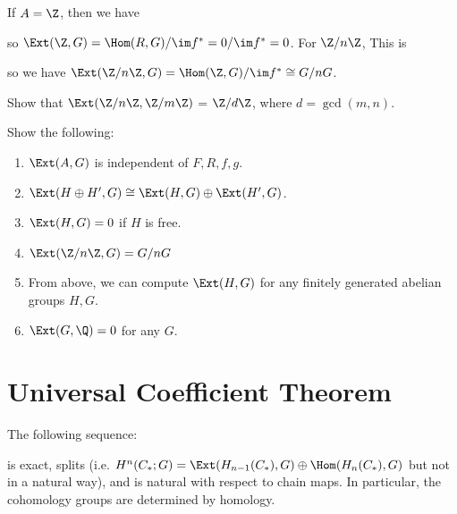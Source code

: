 \begin{example}
  If $A = \Z$, then we have
  \begin{center}
  \end{center}
  so $\Ext(\Z, G) = \Hom(R, G) / {\im f^*} = 0 / {\im f^*} = 0$.
  For $\Z / n\Z$, This is
  \begin{center}
  \end{center}
  so we have $\Ext(\Z / n\Z, G) = \Hom(\Z, G) / {\im f^*} \cong G / n G$.
\end{example}

\begin{exercise}
  Show that $\Ext(\Z / n\Z, \Z / m\Z)$ =
  $\Z / d \Z$, where $d = \gcd(m, n)$.
\end{exercise}

\begin{exercise}
  Show the following:
  \begin{enumerate}
    \item $\Ext(A, G)$ is independent of $F, R, f, g$.
    \item $\Ext(H \oplus H', G) \cong \Ext(H, G) \oplus \Ext(H', G)$.
    \item $\Ext(H, G) = 0$ if $H$ is free.
    \item $\Ext(\Z / n\Z, G) = G / nG$
    \item From above, we can compute
      $\Ext(H, G)$ for any finitely generated
      abelian groups $H, G$.
    \item $\Ext(G, \Q) = 0$ for any $G$.
  \end{enumerate}
\end{exercise}

\section{Universal Coefficient Theorem}

\begin{theorem}
  The following sequence:
  \begin{center}
  \end{center}
  is exact, splits (i.e.
  $H^n(C_*; G) = \Ext(H_{n - 1}(C_*), G) \oplus \Hom(H_n(C_*), G)$ but not in a natural way), and is
  natural with respect
  to chain maps. In particular, the
  cohomology groups are determined by homology.
\end{theorem}

